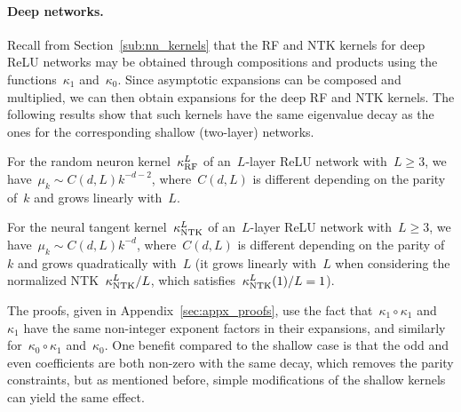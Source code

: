 \paragraph{Deep networks.}
Recall from Section~\ref{sub:nn_kernels} that the RF and NTK kernels for deep ReLU networks may be obtained through compositions and products using the functions~$\kappa_1$ and~$\kappa_0$.
Since asymptotic expansions can be composed and multiplied, we can then obtain expansions for the deep RF and NTK kernels.
The following results show that such kernels have the same eigenvalue decay as the ones for the corresponding shallow (two-layer) networks.
\begin{corollary}
\label{cor:rf_decay}
For the random neuron kernel~$\kappa^L_{{\text{RF}}}$ of an~$L$-layer ReLU network with~$L \geq 3$,
we have~$\mu_k \sim C(d,L) k^{-d-2}$, where~$C(d,L)$ is different depending on the parity of~$k$ and grows linearly with~$L$.
\end{corollary}
\begin{corollary}
\label{cor:ntk_decay}
For the neural tangent kernel~$\kappa^L_{{\text{NTK}}}$ of an~$L$-layer ReLU network with~$L \geq 3$,
we have~$\mu_k \sim C(d, L) k^{-d}$, where~$C(d,L)$ is different depending on the parity of~$k$ and grows quadratically with~$L$ (it grows linearly with~$L$ when considering the normalized NTK~$\kappa^L_{{\text{NTK}}}/L$, which satisfies~$\kappa^L_{{\text{NTK}}}(1)/L=1$).
\end{corollary}
The proofs, given in Appendix~\ref{sec:appx_proofs}, use the fact that~$\kappa_1 \circ \kappa_1$ and~$\kappa_1$ have the same non-integer exponent factors in their expansions, and similarly for~$\kappa_0 \circ \kappa_1$ and~$\kappa_0$.
One benefit compared to the shallow case is that the odd and even coefficients are both non-zero with the same decay, which removes the parity constraints, but as mentioned before, simple modifications of the shallow kernels can yield the same effect.



